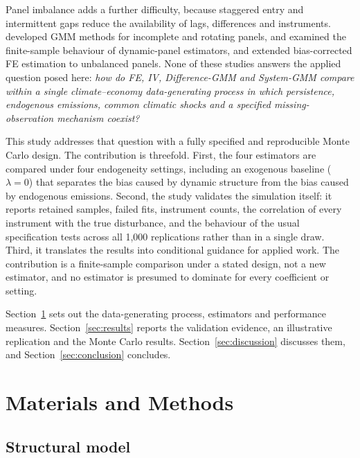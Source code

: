 \documentclass[11pt,a4paper]{article}
\begin{document}
Panel imbalance adds a further difficulty, because staggered entry and intermittent gaps reduce the availability of lags, differences and instruments. \citet{Albarran2019} developed GMM methods for incomplete and rotating panels, \citet{Kiviet1995} and \citet{Judson1999} examined the finite-sample behaviour of dynamic-panel estimators, and \citet{Bruno2005} extended bias-corrected FE estimation to unbalanced panels. None of these studies answers the applied question posed here: \emph{how do FE, IV, Difference-GMM and System-GMM compare within a single climate--economy data-generating process in which persistence, endogenous emissions, common climatic shocks and a specified missing-observation mechanism coexist?}

This study addresses that question with a fully specified and reproducible Monte Carlo design. The contribution is threefold. First, the four estimators are compared under four endogeneity settings, including an exogenous baseline ($\lambda=0$) that separates the bias caused by dynamic structure from the bias caused by endogenous emissions. Second, the study validates the simulation itself: it reports retained samples, failed fits, instrument counts, the correlation of every instrument with the true disturbance, and the behaviour of the usual specification tests across all 1{,}000 replications rather than in a single draw. Third, it translates the results into conditional guidance for applied work. The contribution is a finite-sample comparison under a stated design, not a new estimator, and no estimator is presumed to dominate for every coefficient or setting.

Section~\ref{sec:methods} sets out the data-generating process, estimators and performance measures. Section~\ref{sec:results} reports the validation evidence, an illustrative replication and the Monte Carlo results. Section~\ref{sec:discussion} discusses them, and Section~\ref{sec:conclusion} concludes.

\section{Materials and Methods}\label{sec:methods}

\subsection{Structural model}
\end{document}
